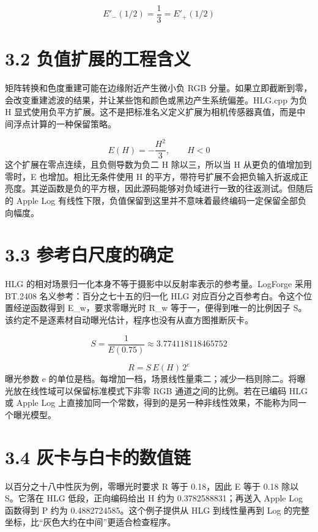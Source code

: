 \documentclass[UTF8,zihao=-4,openany]{ctexbook}
\begin{document}
\begin{equation}
E'_-(1/2)=\frac13=E'_+(1/2)
\end{equation}

\section*{3.2 负值扩展的工程含义}
矩阵转换和色度重建可能在边缘附近产生微小负 RGB 分量。如果立即截断到零，会改变重建滤波的结果，并让某些饱和颜色或黑边产生系统偏差。HLG.cpp 为负 H 显式使用负平方扩展。这不是把标准名义定义扩展为相机传感器真值，而是中间浮点计算的一种保留策略。


\begin{equation}
E(H)=-\frac{H^2}{3},\qquad H<0
\end{equation}
这个扩展在零点连续，且负侧导数为负二 H 除以三，所以当 H 从更负的值增加到零时，E 也增加。相比无条件使用 H 的平方，带符号扩展不会把负输入折返成正亮度。其逆函数是负的平方根，因此源码能够对负域进行一致的往返测试。但随后的 Apple Log 有线性下限，负值保留到这里并不意味着最终编码一定保留全部负向幅度。


\section*{3.3 参考白尺度的确定}
HLG 的相对场景归一化本身不等于摄影中以反射率表示的参考量。LogForge 采用 BT.2408 名义参考：百分之七十五的归一化 HLG 对应百分之百参考白。令这个位置经逆函数得到 E\_w，要求零曝光时 R\_w 等于一，便得到唯一的比例因子 S。该约定不是逐素材自动曝光估计，程序也没有从直方图推断灰卡。


\begin{equation}
S=\frac{1}{E(0.75)}\approx3.774118118465752
\end{equation}

\begin{equation}
R=S\,E(H)\,2^{e}
\end{equation}
曝光参数 e 的单位是档。每增加一档，场景线性量乘二；减少一档则除二。将曝光放在线性域可以保留标准模式下非零 RGB 通道之间的比例。若在已编码 HLG 或 Apple Log 上直接加同一个常数，得到的是另一种非线性效果，不能称为同一个曝光模型。


\section*{3.4 灰卡与白卡的数值链}
以百分之十八中性灰为例，零曝光时要求 R 等于 0.18，因此 E 等于 0.18 除以 S。它落在 HLG 低段，正向编码给出 H 约为 0.3782588831；再送入 Apple Log 函数得到 P 约为 0.4882724585。这个例子提供从 HLG 到线性量再到 Log 的完整坐标，比“灰色大约在中间”更适合检查程序。
\end{document}
